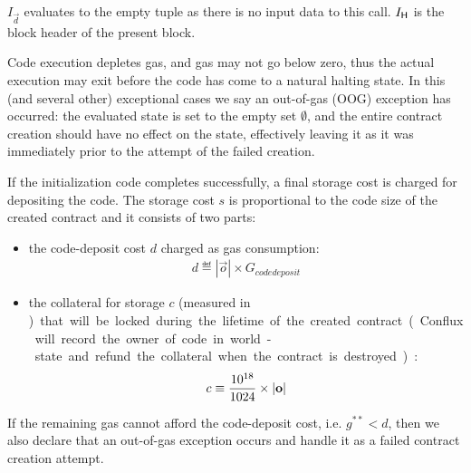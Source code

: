 $I_{\vec{d}}$ evaluates to the empty tuple as there is no input data to this call. 
$I_{\textsf{H}}$ is the block header of the present block.

Code execution depletes gas, and gas may not go below zero, thus the actual execution may exit before the code has come to a natural halting state.
In this (and several other) exceptional cases we say an out-of-gas (OOG) exception has occurred:
the evaluated state is set to the empty set $\emptyset$, 
and the entire contract creation should have no effect on the state, effectively leaving it as it was immediately prior to the attempt of the failed creation.


If the initialization code completes successfully,
a final storage cost is charged for depositing the code.
The storage cost $s$ is proportional to the code size of the created contract and it consists of two parts:
\begin{itemize}
	\item the code-deposit cost $d$ charged as gas consumption:
	\begin{align}
		d \eqdef   |\vec{o}| \times G_{codedeposit}
	\end{align}

	\item the collateral for storage $c$ (measured in \unit) that will be locked during the lifetime of the created contract (Conflux will record the owner of code in world-state and refund the collateral when the contract is destroyed):
	\begin{align}
		c \equiv   \frac{10^{18}}{1024} \times |\mathbf{o}|
	\end{align}
\end{itemize}



If the remaining gas cannot afford the code-deposit cost, i.e. $g^{**}<d$, then we also declare that an out-of-gas exception occurs and handle it as a failed contract creation attempt.
%



